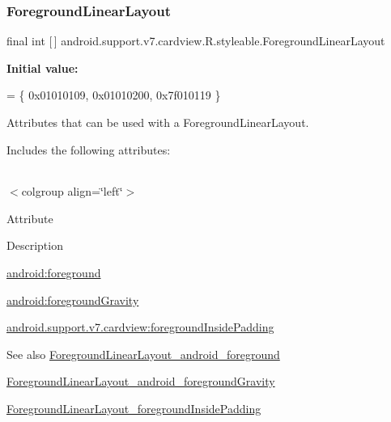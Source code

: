 \subsubsection{\texorpdfstring{Foreground\+Linear\+Layout}{ForegroundLinearLayout}}
{\footnotesize\ttfamily final int \mbox{[}$\,$\mbox{]} android.\+support.\+v7.\+cardview.\+R.\+styleable.\+Foreground\+Linear\+Layout\hspace{0.3cm}{\ttfamily [static]}}

{\bfseries Initial value\+:}
\begin{DoxyCode}
= \{
            0x01010109, 0x01010200, 0x7f010119
        \}
\end{DoxyCode}
Attributes that can be used with a Foreground\+Linear\+Layout. 

Includes the following attributes\+:

\tabulinesep=1mm
\begin{longtabu} spread 0pt [c]{*{0}{|X[-1]}|}
\hline
\end{longtabu}
$<$colgroup align=\char`\"{}left\char`\"{}$>$ 

Attribute

Description 

{\ttfamily \hyperlink{classandroid_1_1support_1_1v7_1_1cardview_1_1R_1_1styleable_a7860635900d3f599a2dfa065f5776024}{android\+:foreground}}

{\ttfamily \hyperlink{classandroid_1_1support_1_1v7_1_1cardview_1_1R_1_1styleable_a390c7059f019cf363c6effe51768a963}{android\+:foreground\+Gravity}}

{\ttfamily \hyperlink{classandroid_1_1support_1_1v7_1_1cardview_1_1R_1_1styleable_af51ca6078731d0a8972be1e77125aff8}{android.\+support.\+v7.\+cardview\+:foreground\+Inside\+Padding}}

\begin{DoxySeeAlso}{See also}
\hyperlink{classandroid_1_1support_1_1v7_1_1cardview_1_1R_1_1styleable_a7860635900d3f599a2dfa065f5776024}{Foreground\+Linear\+Layout\+\_\+android\+\_\+foreground} 

\hyperlink{classandroid_1_1support_1_1v7_1_1cardview_1_1R_1_1styleable_a390c7059f019cf363c6effe51768a963}{Foreground\+Linear\+Layout\+\_\+android\+\_\+foreground\+Gravity} 

\hyperlink{classandroid_1_1support_1_1v7_1_1cardview_1_1R_1_1styleable_af51ca6078731d0a8972be1e77125aff8}{Foreground\+Linear\+Layout\+\_\+foreground\+Inside\+Padding} 
\end{DoxySeeAlso}
\mbox{\label{classandroid_1_1support_1_1v7_1_1cardview_1_1R_1_1styleable_a7860635900d3f599a2dfa065f5776024}} 
